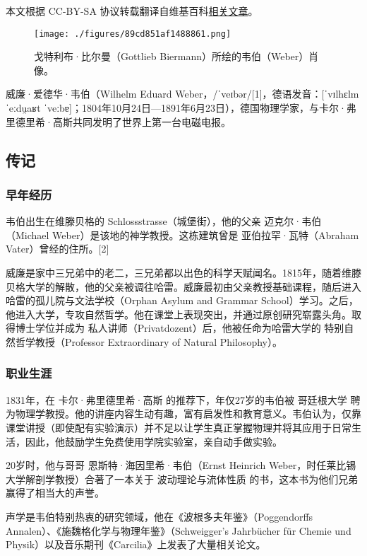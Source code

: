
本文根据 CC-BY-SA 协议转载翻译自维基百科\href{https://en.wikipedia.org/wiki/Wilhelm_Eduard_Weber}{相关文章}。

\begin{figure}[ht]
\centering
\texttt{[image: ./figures/89cd851af1488861.png]}
\caption{戈特利布·比尔曼（Gottlieb Biermann）所绘的韦伯（Weber）肖像。} \label{fig_Eduard_1}
\end{figure}
威廉·爱德华·韦伯（Wilhelm Eduard Weber，/ˈveɪbər/[1]，德语发音：[ˈvɪlhɛlm ˈeːdu̯aʁt ˈveːbɐ]；1804年10月24日—1891年6月23日），德国物理学家，与卡尔·弗里德里希·高斯共同发明了世界上第一台电磁电报。
\subsection{传记}  
\subsubsection{早年经历 } 
韦伯出生在维滕贝格的 Schlossstrasse（城堡街），他的父亲 迈克尔·韦伯（Michael Weber）是该地的神学教授。这栋建筑曾是 亚伯拉罕·瓦特（Abraham Vater）曾经的住所。[2]  

威廉是家中三兄弟中的老二，三兄弟都以出色的科学天赋闻名。1815年，随着维滕贝格大学的解散，他的父亲被调往哈雷。威廉最初由父亲教授基础课程，随后进入哈雷的孤儿院与文法学校（Orphan Asylum and Grammar School）学习。之后，他进入大学，专攻自然哲学。他在课堂上表现突出，并通过原创研究崭露头角。取得博士学位并成为 私人讲师（Privatdozent）后，他被任命为哈雷大学的 特别自然哲学教授（Professor Extraordinary of Natural Philosophy）。
\subsubsection{职业生涯}
1831年，在 卡尔·弗里德里希·高斯 的推荐下，年仅27岁的韦伯被 哥廷根大学 聘为物理学教授。他的讲座内容生动有趣，富有启发性和教育意义。韦伯认为，仅靠课堂讲授（即使配有实验演示）并不足以让学生真正掌握物理并将其应用于日常生活，因此，他鼓励学生免费使用学院实验室，亲自动手做实验。  

20岁时，他与哥哥 恩斯特·海因里希·韦伯（Ernst Heinrich Weber，时任莱比锡大学解剖学教授）合著了一本关于 波动理论与流体性质 的书，这本书为他们兄弟赢得了相当大的声誉。  

声学是韦伯特别热衷的研究领域，他在《波根多夫年鉴》（Poggendorffs Annalen）、《施魏格化学与物理年鉴》（Schweigger's Jahrbücher für Chemie und Physik）以及音乐期刊《Carcilia》上发表了大量相关论文。  

